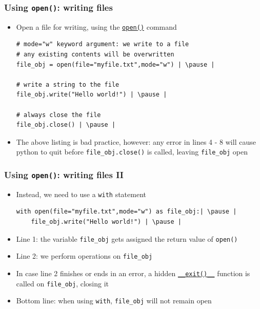 \documentclass[xcolor=table]{beamer}
\begin{document}

\begin{frame}[fragile]
    \frametitle{Using \texttt{open()}: writing files}
\begin{itemize}
    \item Open a file for writing, using the \href{https://docs.python.org/3/library/functions.html\#open}{\texttt{open()}} command \pause
\begin{lstlisting}[style=python]
# mode="w" keyword argument: we write to a file
# any existing contents will be overwritten
file_obj = open(file="myfile.txt",mode="w") | \pause |

# write a string to the file
file_obj.write("Hello world!") | \pause |

# always close the file
file_obj.close() | \pause |
\end{lstlisting}
    \item The above listing is bad practice, however: any error in lines 4 - 8 will cause python to quit before \texttt{file\_obj.close()} is called, leaving \texttt{file\_obj} open
\end{itemize}
\end{frame}

\begin{frame}[fragile]
    \frametitle{Using \texttt{open()}: writing files II}
\begin{itemize}
    \item Instead, we need to use a \texttt{with} statement \pause
\begin{lstlisting}[style=python,belowskip=-0.8 \baselineskip]
with open(file="myfile.txt",mode="w") as file_obj:| \pause |
    file_obj.write("Hello world!") | \pause |
\end{lstlisting}
    \item Line 1: the variable \texttt{file\_obj} gets assigned the return value of \texttt{open()} \pause 
    \item Line 2: we perform operations on \texttt{file\_obj} \pause
    \item In case line 2 finishes or ends in an error, a hidden \href{https://docs.python.org/3/reference/datamodel.html#object.__exit__}{\texttt{\_\_exit()\_\_}} function is called on \texttt{file\_obj}, closing it \pause
    \item Bottom line: when using \texttt{with}, \texttt{file\_obj} will not remain open
\end{itemize}
\end{frame}
\end{document}
